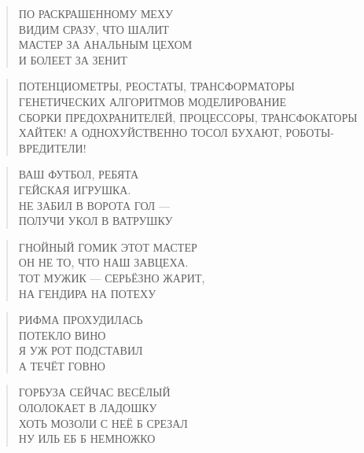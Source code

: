 \poemtitle{***}
\begin{verse}
ПО РАСКРАШЕННОМУ МЕХУ\\
ВИДИМ СРАЗУ, ЧТО ШАЛИТ\\
МАСТЕР ЗА АНАЛЬНЫМ ЦЕХОМ\\
И БОЛЕЕТ ЗА ЗЕНИТ
\end{verse}

\poemtitle{***}
\begin{verse}
ПОТЕНЦИОМЕТРЫ,  РЕОСТАТЫ, ТРАНСФОРМАТОРЫ\\
ГЕНЕТИЧЕСКИХ АЛГОРИТМОВ МОДЕЛИРОВАНИЕ\\
СБОРКИ ПРЕДОХРАНИТЕЛЕЙ, ПРОЦЕССОРЫ, ТРАНСФОКАТОРЫ\\
ХАЙТЕК! А ОДНОХУЙСТВЕННО ТОСОЛ БУХАЮТ, РОБОТЫ-ВРЕДИТЕЛИ!
\end{verse}

\poemtitle{***}
\begin{verse}
ВАШ ФУТБОЛ, РЕБЯТА\\
ГЕЙСКАЯ ИГРУШКА.\\
НЕ ЗАБИЛ В ВОРОТА ГОЛ —\\
ПОЛУЧИ УКОЛ В ВАТРУШКУ
\end{verse}

\poemtitle{***}
\begin{verse}
ГНОЙНЫЙ ГОМИК ЭТОТ МАСТЕР\\
ОН НЕ ТО, ЧТО НАШ ЗАВЦЕХА.\\
ТОТ МУЖИК — СЕРЬЁЗНО ЖАРИТ,\\
НА ГЕНДИРА НА ПОТЕХУ
\end{verse}

\poemtitle{***}
\begin{verse}
РИФМА ПРОХУДИЛАСЬ\\
ПОТЕКЛО ВИНО\\
Я УЖ РОТ ПОДСТАВИЛ\\
А ТЕЧЁТ ГОВНО
\end{verse}

\poemtitle{***}
\begin{verse}
ГОРБУЗА СЕЙЧАС ВЕСЁЛЫЙ\\
ОЛОЛОКАЕТ В ЛАДОШКУ\\
ХОТЬ МОЗОЛИ С НЕЁ Б СРЕЗАЛ\\
НУ ИЛЬ ЕБ Б НЕМНОЖКО
\end{verse}

